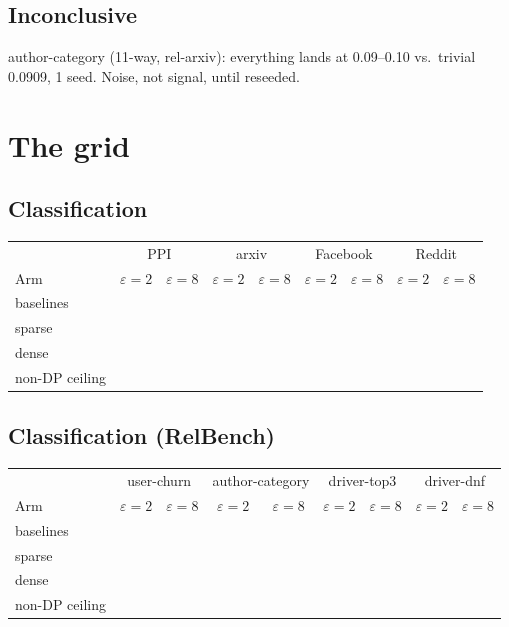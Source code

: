 \documentclass{article}
\begin{document}
\subsection{Inconclusive}
author-category (11-way, rel-arxiv): everything lands at 0.09--0.10 vs.\
trivial 0.0909, 1 seed. Noise, not signal, until reseeded.

\section{The grid}
\label{sec:grid}

\subsection{Classification}
\begin{table}[H]
  \centering\footnotesize
  \begin{tabular}{lcccccccc}
    \toprule
    & \multicolumn{2}{c}{PPI} & \multicolumn{2}{c}{arxiv} & \multicolumn{2}{c}{Facebook} & \multicolumn{2}{c}{Reddit} \\
    Arm & $\varepsilon{=}2$ & $\varepsilon{=}8$ & $\varepsilon{=}2$ & $\varepsilon{=}8$ & $\varepsilon{=}2$ & $\varepsilon{=}8$ & $\varepsilon{=}2$ & $\varepsilon{=}8$ \\
    \midrule
    baselines & & & & & & & & \\
    sparse & & & & & & & & \\
    dense & & & & & & & & \\
    \midrule
    non-DP ceiling & \multicolumn{2}{c}{} & \multicolumn{2}{c}{} & \multicolumn{2}{c}{} & \multicolumn{2}{c}{} \\
    \bottomrule
  \end{tabular}
\end{table}

\subsection{Classification (RelBench)}
\begin{table}[H]
  \centering\footnotesize
  \begin{tabular}{lcccccccc}
    \toprule
    & \multicolumn{2}{c}{user-churn} & \multicolumn{2}{c}{author-category} & \multicolumn{2}{c}{driver-top3} & \multicolumn{2}{c}{driver-dnf} \\
    Arm & $\varepsilon{=}2$ & $\varepsilon{=}8$ & $\varepsilon{=}2$ & $\varepsilon{=}8$ & $\varepsilon{=}2$ & $\varepsilon{=}8$ & $\varepsilon{=}2$ & $\varepsilon{=}8$ \\
    \midrule
    baselines & & & & & & & & \\
    sparse & & & & & & & & \\
    dense & & & & & & & & \\
    \midrule
    non-DP ceiling & \multicolumn{2}{c}{} & \multicolumn{2}{c}{} & \multicolumn{2}{c}{} & \multicolumn{2}{c}{} \\
    \bottomrule
  \end{tabular}
\end{table}
\end{document}
